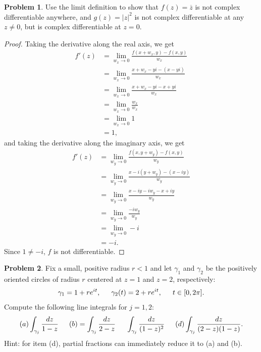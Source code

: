 \documentclass[12pt]{article}
\theoremstyle{definition}
\newtheorem{ex}{Problem}
\begin{document}
\begin{ex}
	Use the limit definition to show that $f(z) = \overline{z}$ is not complex differentiable anywhere, and $g(z) = |z|^2$ is not complex differentiable at any $z \neq 0$, but is complex differentiable at $z = 0$.
\end{ex}
\begin{proof}
  Taking the derivative along the real axis, we get
	\begin{align*}
		f'(z) & = \lim_{w_x \to 0} \frac{f(x+w_x, y) - f(x, y)}{w_x} \\
		      & = \lim_{w_x \to 0} \frac{x + w_x - yi - (x - yi)}{w_x} \\
		      & = \lim_{w_x \to 0} \frac{x + w_x - yi - x + yi}{w_x} \\
		      & = \lim_{w_x \to 0} \frac{w_x}{w_x} \\
		      & = \lim_{w_x \to 0} 1 \\
          & = 1,
	\end{align*}
  and taking the derivative along the imaginary axis, we get
	\begin{align*}
		f'(z) & = \lim_{w_y \to 0} \frac{f(x, y + w_y) - f(x, y)}{w_y} \\
          & = \lim_{w_y \to 0} \frac{x - i(y + w_y) - (x - iy)}{w_y} \\
          & = \lim_{w_y \to 0} \frac{x - iy - iw_y - x + iy}{w_y} \\
          & = \lim_{w_y \to 0} \frac{-iw_y}{w_y} \\
          & = \lim_{w_y \to 0} -i \\
          & = -i.
	\end{align*}
  Since $1 \neq -i$, $f$ is not differentiable.
\end{proof}

\begin{ex}
	Fix a small, positive radius $r < 1$ and let $\gamma_1$ and $\gamma_2$ be the positively oriented circles of radius $r$ centered at $z = 1$ and $z = 2$, respectively: \begin{equation*}
		\gamma_1 = 1 + re^{it}, \hspace{1.5em} \gamma_2(t) = 2+re^{it},\hspace{1.5em} t \in [0, 2\pi].
	\end{equation*}
	Compute the following line integrals for $j = 1,2$: \begin{equation*}
		(a) \int_{\gamma_j} \frac{dz}{1-z} \hspace{1.5em} (b) = \int_{\gamma_j}\frac{dz}{2-z} \hspace{1.5em} \int_{\gamma_j} \frac{dz}{(1-z)^2} \hspace{1.5em} (d) \int_{\gamma_j} \frac{dz}{(2-z)(1-z)}.
	\end{equation*}
	Hint: for item (d), partial fractions can immediately reduce it to (a) and (b).
\end{ex}
\end{document}
